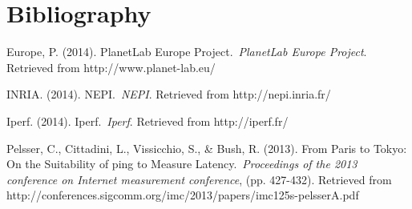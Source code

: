 \documentclass[a4paper]{article}
\begin{document}
\section[Bibliography]{Bibliography}
\hypertarget{Toc387315390}{}Europe, P. (2014). PlanetLab Europe
Project.\ \textit{PlanetLab Europe Project}. Retrieved from
http://www.planet-lab.eu/

INRIA. (2014). NEPI.\ \textit{NEPI}. Retrieved from
http://nepi.inria.fr/

Iperf. (2014). Iperf.\ \textit{Iperf}. Retrieved from http://iperf.fr/

Pelsser, C., Cittadini, L., Vissicchio, S., \& Bush, R. (2013). From
Paris to Tokyo: On the Suitability of ping to Measure
Latency.\ \textit{Proceedings of the 2013 conference on Internet
measurement conference}, (pp. 427-432). Retrieved from
http://conferences.sigcomm.org/imc/2013/papers/imc125s-pelsserA.pdf


\bigskip


\bigskip


\bigskip
\end{document}
